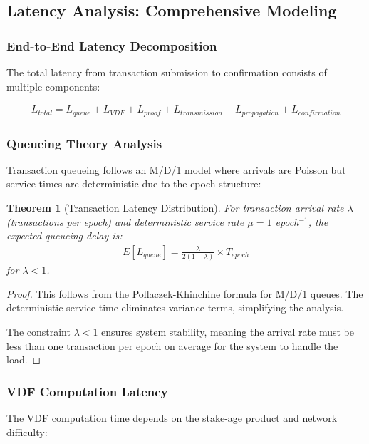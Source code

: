 \documentclass[11pt,a4paper]{article}
\newtheorem{theorem}{Theorem}[section]
\begin{document}
\subsection{Latency Analysis: Comprehensive Modeling}

\subsubsection{End-to-End Latency Decomposition}

The total latency from transaction submission to confirmation consists of multiple components:

\begin{align}
L_{total} = L_{queue} + L_{VDF} + L_{proof} + L_{transmission} + L_{propagation} + L_{confirmation}
\end{align}

\subsubsection{Queueing Theory Analysis}

Transaction queueing follows an M/D/1 model where arrivals are Poisson but service times are deterministic due to the epoch structure:

\begin{theorem}[Transaction Latency Distribution]
For transaction arrival rate $\lambda$ (transactions per epoch) and deterministic service rate $\mu = 1$ epoch$^{-1}$, the expected queueing delay is:
\begin{align}
E[L_{queue}] = \frac{\lambda}{2(1-\lambda)} \times T_{epoch}
\end{align}
for $\lambda < 1$.
\end{theorem}

\begin{proof}
This follows from the Pollaczek-Khinchine formula for M/D/1 queues. The deterministic service time eliminates variance terms, simplifying the analysis.

The constraint $\lambda < 1$ ensures system stability, meaning the arrival rate must be less than one transaction per epoch on average for the system to handle the load.
\end{proof}

\subsubsection{VDF Computation Latency}

The VDF computation time depends on the stake-age product and network difficulty:
\end{document}
